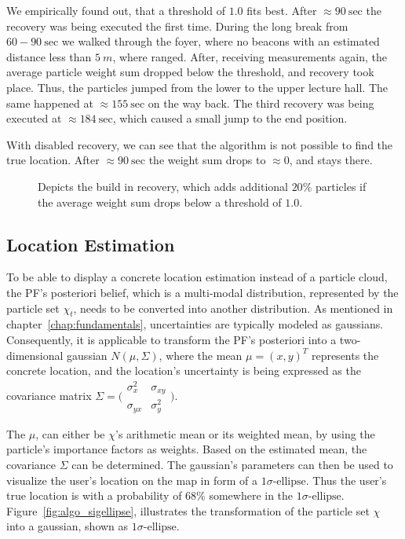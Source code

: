 We empirically found out, that a threshold of $1.0$ fits best. After $\approx 90~\text{sec}$ the recovery was being executed the first time. During the long break from $60 - 90~\text{sec}$ we walked through the foyer, where no beacons with an estimated distance less than $5~m$, where ranged. After, receiving measurements again, the average particle weight sum dropped below the threshold, and recovery took place. Thus, the particles jumped from the lower to the upper lecture hall. The same happened at $\approx 155~\text{sec}$ on the way back. The third recovery was being executed at $\approx 184~\text{sec}$, which caused a small jump to the end position.

With disabled recovery, we can see that the algorithm is not possible to find the true location. After $\approx 90~\text{sec}$ the weight sum drops to $\approx 0$, and stays there.




\begin{figure}
	
	\caption {Depicts the build in recovery, which adds additional $20\%$ particles if the average weight sum drops below a threshold of $1.0$.}
	\label{fig:algo_recovery}
\end{figure}

\subsection{Location Estimation}\label{sec:algo_locEstimation}
To be able to display a concrete location estimation instead of a particle cloud, the \acs{PF}'s posteriori belief, which is a multi-modal distribution, represented by the particle set $\chi_t$, needs to be converted into another distribution. As mentioned in chapter~\ref{chap:fundamentals}, uncertainties are typically modeled as gaussians. Consequently, it is applicable to transform the \acs{PF}'s posteriori into a two-dimensional gaussian $N(\mu, \Sigma)$, where the mean $\mu = (x, y)^T$ represents the concrete location, and the location's uncertainty is being expressed as the covariance matrix $\Sigma = \bigl(\begin{smallmatrix} \sigma_{x}^2&\sigma_{xy}\\ \sigma_{yx}&\sigma_{y}^2 \end{smallmatrix} \bigr)$.

The $\mu$, can either be $\chi$'s arithmetic mean or its weighted mean, by using the particle's importance factors as weights. Based on the estimated mean, the covariance $\Sigma$ can be determined. The gaussian's parameters can then be used to visualize the user's location on the map in form of a $1\sigma\text{-ellipse}$. Thus the user's true location is with a probability of $68\%$ somewhere in the $1\sigma\text{-ellipse}$. Figure~\ref{fig:algo_sigellipse}, illustrates the transformation of the particle set $\chi$ into a gaussian, shown as $1\sigma\text{-ellipse}$.

